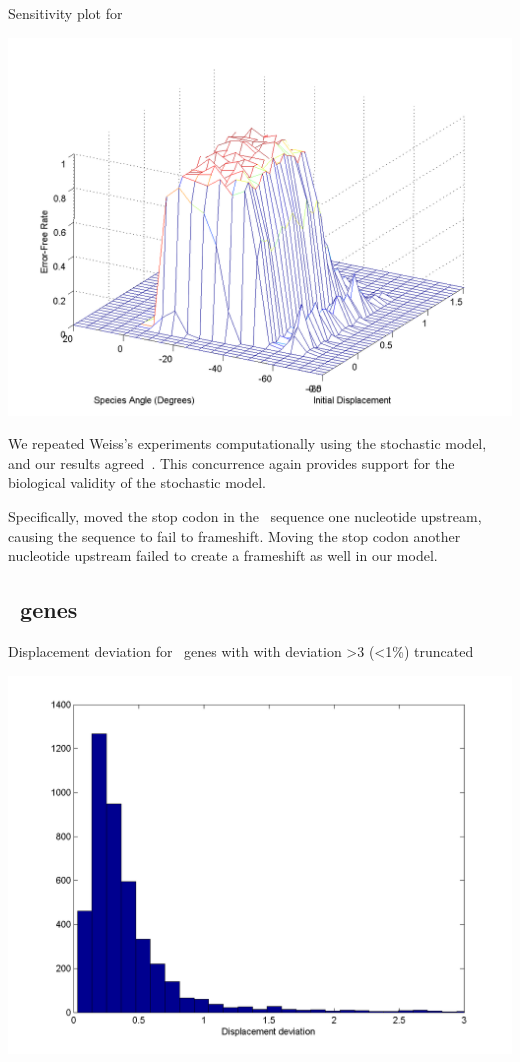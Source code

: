 \documentclass[12pt, draft]{article}
\numberwithin{equation}{section}
\begin{document}
\begin{cfigure}
  \caption{Sensitivity plot for \prfB}
  \label{prfB:sens}
  \includegraphics[scale=0.4]{prfB/sensitivity}
\end{cfigure}

We repeated Weiss's experiments computationally
using the stochastic model, and our results agreed~\cite{weiss87,weiss88}.
This concurrence again provides support for the biological validity of
the stochastic model.

Specifically, \citeauthor{weiss87} moved the stop codon in the
\prfB\ sequence one nucleotide upstream, causing the sequence to fail to
frameshift. Moving the stop codon another nucleotide upstream failed
to create a frameshift as well in our model.

\subsection{\ecoli\ genes}
\begin{cfigure}
  \caption{Displacement deviation for \ecoli\ genes with with
    deviation >3 (<1\%) truncated}
  \label{ecoli:hist}
  \includegraphics[scale=0.4]{histograms/everything}
\end{cfigure}
\end{document}
